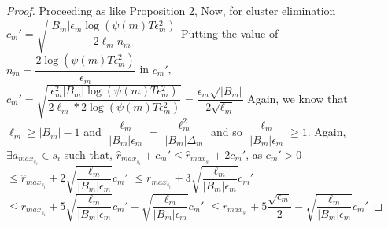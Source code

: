 \begin{proof}
\newline
Proceeding as like Proposition 2,
\newline
\newline Now, for cluster elimination $c_{m}'=\sqrt{\dfrac{|B_{m}|\epsilon_{m}\log (\psi(m)T\epsilon_{m}^{2})}{2\ell_{m} n_{m}}}$
\newline Putting the value of $n_{m}=\dfrac{2\log{(\psi(m)T\epsilon_{m}^{2})}}{\epsilon_{m}}$ in $c_{m}'$,
\newline $c_{m}'=\sqrt{\dfrac{\epsilon_{m}^{2}|B_{m}|\log (\psi(m)T\epsilon_{m}^{2})}{2\ell_{m}*2 \log(\psi(m)T\epsilon_{m}^{2})}}=\dfrac{\epsilon_{m}\sqrt{|B_{m}|}}{2\sqrt{\ell_{m}}}$
\newline Again, we know that $\ell_{m}\geq |B_{m}|-1$ and $\dfrac{\ell_{m}}{|B_{m}|\epsilon_{m}}=\dfrac{\ell_{m}^{2}}{|B_{m}|\Delta_{m}}$ and so $\dfrac{\ell_{m}}{|B_{m}|\epsilon_{m}}\geq 1$.
\newline Again, $\exists a_{max_{s_{i}}} \in s_{i}$ such that, 
$\hat{r}_{max_{s_{i}}} + c_{m}'\leq \hat{r}_{max_{s_{i}}} + 2c_{m}'$, as $c_{m}' > 0$
\newline\hspace*{14em}$\leq\hat{r}_{max_{s_{i}}} + 2\sqrt{\dfrac{\ell_{m}}{|B_{m}|\epsilon_{m}}}c_{m}' $
\newline\hspace*{14em}$\leq r_{max_{s_{i}}} + 3\sqrt{\dfrac{\ell_{m}}{|B_{m}|\epsilon_{m}}}c_{m}'$
\newline\hspace*{14em}$\leq r_{max_{s_{i}}} + 5\sqrt{\dfrac{\ell_{m}}{|B_{m}|\epsilon_{m}}}c_{m}'-\sqrt{\dfrac{\ell_{m}}{|B_{m}|\epsilon_{m}}}c_{m}'$
\newline\hspace*{14em}$\leq r_{max_{s_{i}}} + 5\dfrac{\sqrt{\epsilon_{m}}}{2}-\sqrt{\dfrac{\ell_{m}}{|B_{m}|\epsilon_{m}}}c_{m}'$

\end{proof}
